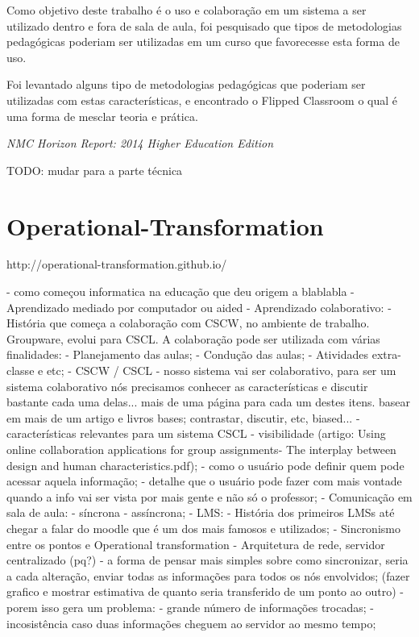 Como objetivo deste trabalho é o uso e colaboração em um sistema a ser utilizado dentro e fora de sala de aula, foi pesquisado que tipos de metodologias pedagógicas poderiam ser utilizadas em um curso que favorecesse esta forma de uso.

Foi levantado alguns tipo de metodologias pedagógicas que poderiam ser utilizadas com estas características, e encontrado o Flipped Classroom o qual é uma forma de mesclar teoria e prática.

\emph{NMC Horizon Report: 2014 Higher Education Edition}


TODO: mudar para a parte técnica
\section{Operational-Transformation}
http://operational-transformation.github.io/


            - como começou informatica na educação que deu origem a blablabla
            - Aprendizado mediado por computador ou aided
            - Aprendizado colaborativo:
                - História que começa a colaboração com CSCW, no ambiente de trabalho. Groupware, evolui para CSCL. A colaboração pode ser utilizada com várias finalidades:
                    - Planejamento das aulas;
                    - Condução das aulas;
                    - Atividades extra-classe e etc;
                - CSCW / CSCL
                    - nosso sistema vai ser colaborativo, para ser um sistema colaborativo nós precisamos conhecer as características e discutir bastante cada uma delas... mais de uma página para cada um destes itens. basear em mais de um artigo e livros bases; contrastar, discutir, etc, biased...
                    - características relevantes para um sistema CSCL
                        - visibilidade (artigo: Using online collaboration applications for group assignments- The interplay between design and human characteristics.pdf);
                    - como o usuário pode definir quem pode acessar aquela informação;
                    - detalhe que o usuário pode fazer com mais vontade quando a info vai ser vista por mais gente e não só o professor;
                        - Comunicação em sala de aula: 
                            - síncrona 
                            - assíncrona;
            - LMS:
                - História dos primeiros LMSs até chegar a falar do moodle que é um dos mais famosos e utilizados;
            - Sincronismo entre os pontos e Operational transformation
                - Arquitetura de rede, servidor centralizado (pq?)
                - a forma de pensar mais simples sobre como sincronizar, seria a cada alteração, enviar todas as informações para todos os nós envolvidos;
                (fazer grafico e mostrar estimativa de quanto seria transferido de um ponto ao outro)
                    - porem isso gera um problema: 
                        - grande número de informações trocadas;
                        - incosistência caso duas informações cheguem ao servidor ao mesmo tempo;



